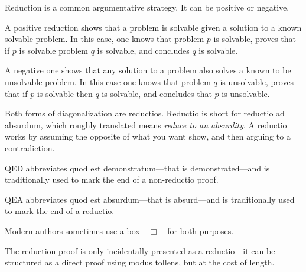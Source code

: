 \documentclass[../../include/open-logic-section]{subfiles}
\begin{document}

Reduction is a common argumentative strategy. It can be positive or
negative.

A positive reduction shows that a problem is solvable given a solution to a
known solvable problem. In this case, one knows that problem $p$ is
solvable, proves that if $p$ is solvable problem $q$ is solvable, and
concludes $q$ is solvable.

A negative one shows that any solution to a problem also solves a known to
be unsolvable problem. In this case one knows that problem $q$ is
unsolvable, proves that if $p$ is solvable then $q$ is solvable, and
concludes that $p$ is unsolvable.

Both forms of diagonalization are reductios. Reductio is short for reductio
ad absurdum, which roughly translated means \emph{reduce to an absurdity}.
A reductio works by assuming the opposite of what you want show, and then
arguing to a contradiction.

QED abbreviates quod est demonstratum---that is demonstrated---and is
traditionally used to mark the end of a non-reductio proof.

QEA abbreviates quod est absurdum---that is absurd---and is traditionally
used to mark the end of a reductio.

Modern authors sometimes use a box---$\Box$---for both purposes.

The reduction proof is only incidentally presented as a reductio---it can
be structured as a direct proof using modus tollens, but at the cost of
length.
\end{document}
